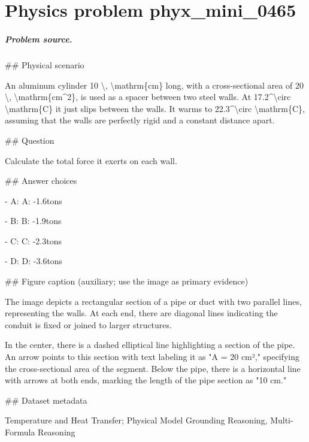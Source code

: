 
\chapter{Physics problem phyx\_mini\_0465}
\label{ch:PhyXMiniProblems_problem_phyx_mini_0465}

\paragraph{Problem source.}
\#\# Physical scenario

An aluminum cylinder 10 \textbackslash{}, \textbackslash{}mathrm\{cm\} long, with a cross-sectional area of 20 \textbackslash{}, \textbackslash{}mathrm\{cm\textasciicircum{}2\}, is used as a spacer between two steel walls. At 17.2\textasciicircum{}\textbackslash{}circ \textbackslash{}mathrm\{C\} it just slips between the walls. It warms to 22.3\textasciicircum{}\textbackslash{}circ \textbackslash{}mathrm\{C\}, assuming that the walls are perfectly rigid and a constant distance apart.

\#\# Question

Calculate the total force it exerts on each wall.

\#\# Answer choices

- A: A: -1.6tons

- B: B: -1.9tons

- C: C: -2.3tons

- D: D: -3.6tons

\#\# Figure caption (auxiliary; use the image as primary evidence)

The image depicts a rectangular section of a pipe or duct with two parallel lines, representing the walls. At each end, there are diagonal lines indicating the conduit is fixed or joined to larger structures.

In the center, there is a dashed elliptical line highlighting a section of the pipe. An arrow points to this section with text labeling it as "A = 20 cm²," specifying the cross-sectional area of the segment. Below the pipe, there is a horizontal line with arrows at both ends, marking the length of the pipe section as "10 cm."

\#\# Dataset metadata

Temperature and Heat Transfer; Physical Model Grounding Reasoning, Multi-Formula Reasoning


